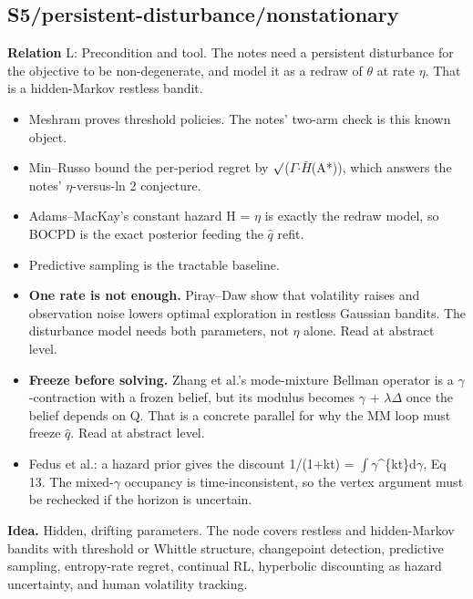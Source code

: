 \documentclass[10pt]{article}
\begin{document}
\subsection{S5/persistent-disturbance/nonstationary}\label{node:S5-S5-persistent-disturbance-nonstationary}
\textbf{Relation} \textsf{L}: Precondition and tool. The notes need a persistent disturbance for the objective to be non-degenerate, and model it as a redraw of \ensuremath{\theta} at rate \ensuremath{\eta}. That is a hidden-Markov restless bandit.
\begin{itemize}[nosep,leftmargin=1.2em]
\item Meshram proves threshold policies. The notes' two-arm check is this known object.
\item Min--Russo bound the per-period regret by \ensuremath{\surd}(\ensuremath{\Gamma}\ensuremath{\cdot}\ensuremath{\bar{H}}(A*)), which answers the notes' \ensuremath{\eta}-versus-ln 2 conjecture.
\item Adams--MacKay's constant hazard H = \ensuremath{\eta} is exactly the redraw model, so BOCPD is the exact posterior feeding the \ensuremath{\hat{q}} refit.
\item Predictive sampling is the tractable baseline.
\item \textbf{One rate is not enough.} Piray--Daw show that volatility raises and observation noise lowers optimal exploration in restless Gaussian bandits. The disturbance model needs both parameters, not \ensuremath{\eta} alone. Read at abstract level.
\item \textbf{Freeze before solving.} Zhang et al.'s mode-mixture Bellman operator is a \ensuremath{\gamma}-contraction with a frozen belief, but its modulus becomes \ensuremath{\gamma} + \ensuremath{\lambda}\ensuremath{\Delta} once the belief depends on Q. That is a concrete parallel for why the MM loop must freeze \ensuremath{\hat{q}}. Read at abstract level.
\item Fedus et al.: a hazard prior gives the discount 1/(1+kt) = \ensuremath{\int}\ensuremath{\gamma}\^{}\{kt\}d\ensuremath{\gamma}, Eq 13. The mixed-\ensuremath{\gamma} occupancy is time-inconsistent, so the vertex argument must be rechecked if the horizon is uncertain.
\end{itemize}


\textbf{Idea.} Hidden, drifting parameters. The node covers restless and hidden-Markov bandits with threshold or Whittle structure, changepoint detection, predictive sampling, entropy-rate regret, continual RL, hyperbolic discounting as hazard uncertainty, and human volatility tracking.
\end{document}
